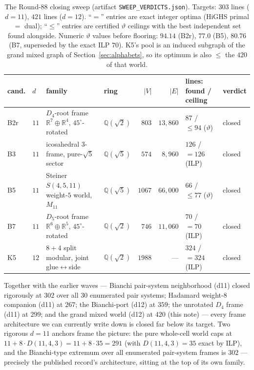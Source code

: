 \documentclass[11pt]{article}
\theoremstyle{remark}
\newcommand{\RR}{\mathbb{R}}
\newcommand{\QQ}{\mathbb{Q}}
\begin{document}
\begin{table}[h]
\centering
\small
\begin{tabular}{@{}llllrrll@{}}
\toprule
cand. & $d$ & family & ring & $|V|$ & $|E|$ & lines: found / ceiling & verdict \\
\midrule
B2r & $11$ & $D_4$-root frame $\RR^7{\oplus}\RR^4$, $45^\circ$-rotated & $\QQ(\sqrt2)$ & $803$ & $13{,}860$ & $87$ / $\le94$ ($\vartheta$) & closed \\
B3 & $11$ & icosahedral $3$-frame, pure-$\sqrt5$ sector & $\QQ(\sqrt5)$ & $574$ & $8{,}960$ & $126$ / $=126$ (ILP) & closed \\
B5 & $11$ & Steiner $S(4,5,11)$ weight-$5$ world, $M_{11}$ & $\QQ(\sqrt5)$ & $1067$ & $66{,}000$ & $66$ / $\le77$ ($\vartheta$) & closed \\
B7 & $11$ & $D_5$-root frame $\RR^6{\oplus}\RR^5$, $45^\circ$-rotated & $\QQ(\sqrt2)$ & $746$ & $11{,}060$ & $70$ / $=70$ (ILP) & closed \\
K5 & $12$ & $8{+}4$ split modular, joint glue$\leftrightarrow$side & $\QQ(\sqrt2)$ & $1988$ & --- & $324$ / $=324$ (ILP) & closed \\
\bottomrule
\end{tabular}
\caption{The Round-88 closing sweep (artifact
\texttt{SWEEP\_VERDICTS.json}). Targets: $303$ lines ($d=11$),
$421$ lines ($d=12$). ``$=$'' entries are exact integer optima
(HiGHS primal $=$ dual); ``$\le$'' entries are certified $\vartheta$
ceilings with the best independent set found alongside. Numeric
$\vartheta$ values before flooring: $94.14$ (B2r), $77.0$ (B5),
$80.76$ (B7, superseded by the exact ILP $70$). K5's pool is an induced
subgraph of the grand mixed graph of Section~\ref{sec:alphabets}, so its
optimum is also $\le$ the $420$ of that world.}
\label{tab:sweep}
\end{table}

Together with the earlier waves --- Bianchi pair-system neighborhood
(d11) closed rigorously at $302$ over all $30$ enumerated pair systems;
Hadamard weight-$8$ companion (d11) at $267$; the Bianchi-port (d12) at
$359$; the unrotated $D_4$ frame (d11) at $299$; and the grand mixed world
(d12) at $420$ (this note) --- every frame architecture we can currently
write down is closed far below its target. Two rigorous $d=11$ anchors
frame the picture: the pure whole-cell world caps at
$11+8\cdot D(11,4,3)=11+8\cdot35=291$ (with $D(11,4,3)=35$ exact by ILP),
and the Bianchi-type extremum over all enumerated pair-system frames is
$302$ --- precisely the published record's architecture, sitting at the
top of its own family.
\end{document}
